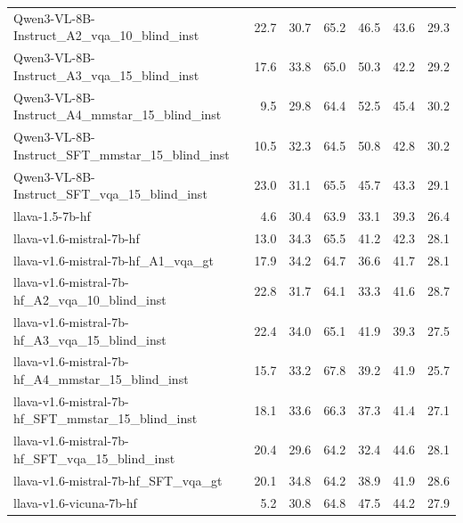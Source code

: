 \begin{tabular}{lrrrrrr}
Qwen3-VL-8B-Instruct_A2_vqa_10_blind_inst & 22.7 & 30.7 & 65.2 & 46.5 & 43.6 & 29.3 \\
Qwen3-VL-8B-Instruct_A3_vqa_15_blind_inst & 17.6 & 33.8 & 65.0 & 50.3 & 42.2 & 29.2 \\
Qwen3-VL-8B-Instruct_A4_mmstar_15_blind_inst & 9.5 & 29.8 & 64.4 & 52.5 & 45.4 & 30.2 \\
Qwen3-VL-8B-Instruct_SFT_mmstar_15_blind_inst & 10.5 & 32.3 & 64.5 & 50.8 & 42.8 & 30.2 \\
Qwen3-VL-8B-Instruct_SFT_vqa_15_blind_inst & 23.0 & 31.1 & 65.5 & 45.7 & 43.3 & 29.1 \\
llava-1.5-7b-hf & 4.6 & 30.4 & 63.9 & 33.1 & 39.3 & 26.4 \\
llava-v1.6-mistral-7b-hf & 13.0 & 34.3 & 65.5 & 41.2 & 42.3 & 28.1 \\
llava-v1.6-mistral-7b-hf_A1_vqa_gt & 17.9 & 34.2 & 64.7 & 36.6 & 41.7 & 28.1 \\
llava-v1.6-mistral-7b-hf_A2_vqa_10_blind_inst & 22.8 & 31.7 & 64.1 & 33.3 & 41.6 & 28.7 \\
llava-v1.6-mistral-7b-hf_A3_vqa_15_blind_inst & 22.4 & 34.0 & 65.1 & 41.9 & 39.3 & 27.5 \\
llava-v1.6-mistral-7b-hf_A4_mmstar_15_blind_inst & 15.7 & 33.2 & 67.8 & 39.2 & 41.9 & 25.7 \\
llava-v1.6-mistral-7b-hf_SFT_mmstar_15_blind_inst & 18.1 & 33.6 & 66.3 & 37.3 & 41.4 & 27.1 \\
llava-v1.6-mistral-7b-hf_SFT_vqa_15_blind_inst & 20.4 & 29.6 & 64.2 & 32.4 & 44.6 & 28.1 \\
llava-v1.6-mistral-7b-hf_SFT_vqa_gt & 20.1 & 34.8 & 64.2 & 38.9 & 41.9 & 28.6 \\
llava-v1.6-vicuna-7b-hf & 5.2 & 30.8 & 64.8 & 47.5 & 44.2 & 27.9 \\
\bottomrule
\end{tabular}
